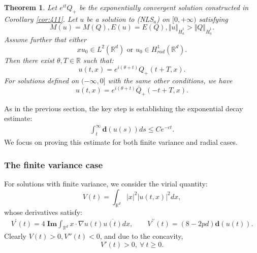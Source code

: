 \documentclass[12pt]{amsart}
\newtheorem{theorem}{Theorem}[section]
\begin{document}
\begin{theorem}
\label{thm: super case} Let $e^{it}Q_+$ be the exponentially convergent solution constructed in Corollary \ref{cor:411}. Let $u$ be a solution to (NLS$_{a}$) on $%
[0,+\infty )$ satisfying 
\begin{equation}
M(u)=M(Q),E(u)=E(Q),\Vert u\Vert _{\dot{H}_{a}^{1}}>\Vert Q\Vert _{\dot{H}%
_{a}^{1}}.  \label{549}
\end{equation}%
Assume further that either
\begin{equation*}
xu_{0}\in L^{2}(\mathbb{R}^{d})\text{ or }u_{0}\in H_{rad}^{1}(\mathbb{R}%
^{d}).
\end{equation*}%
Then there exist $\theta, T\in \mathbb R$ such that:
\[
u(t,x)=e^{i(\theta +t)}Q_{+}(t+T,x).
\] 
For solutions defined on $(-\infty, 0]$ with the same other conditions, we have
\[
u(t,x)=e^{i(\theta+t)}\bar Q_+(-t+T, x). 
\]
\end{theorem}


As in the previous section, the key step is establishing the exponential decay estimate:
\begin{align}\label{531}
\int_t^\infty \mathbf{d}(u(s))ds \le C e^{-ct}. 
\end{align}
We focus on proving this estimate for both finite variance and radial cases. 


\subsubsection{The finite variance case}  For solutions with finite variance, we consider the virial quantity: 
\[
V(t)=\int_{\mathbb{R}^{d}}|x|^{2}|u(t,x)|^2dx,
\]
whose derivatives satisfy:
\begin{eqnarray*}
V^{\prime }(t) =4\;\mathbf{Im}\int_{\mathbb{R}^{d}}x\cdot \nabla u(t)%
\overline{u(t)}dx, \qquad
V^{\prime \prime }(t) =(8-2pd)\mathbf{d}(u(t)).
\end{eqnarray*}
Clearly $V(t)>0, V''(t)<0$, and due to the concavity,  
\[
V'(t)>0, \ \forall \ t\ge 0. 
\]
\end{document}
